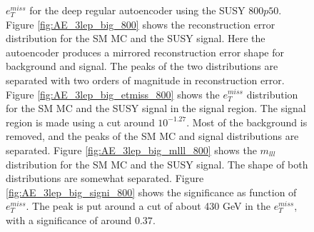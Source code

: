 \begin{figure}[H]
{    $e_T^{miss}$ for the deep regular autoencoder using the SUSY $800p50$. 
    Figure \ref{fig:AE_3lep_big_800} shows the reconstruction error 
    distribution for the SM MC and the SUSY signal. Here the autoencoder produces a mirrored reconstruction error shape for background and 
    signal. The peaks of the two distributions are separated with two orders of magnitude in reconstruction error. Figure \ref{fig:AE_3lep_big_etmiss_800} 
    shows the $e_T^{miss}$ distribution for the SM MC and the SUSY signal in the signal region. 
    The signal region is made using a cut around $10^{-1.27}$. Most of the background is removed, and the peaks of the SM MC and signal 
    distributions are separated. Figure \ref{fig:AE_3lep_big_mlll_800} shows the $m_{lll}$ distribution for the SM MC and the SUSY signal. 
    The shape of both distributions are somewhat separated. Figure \ref{fig:AE_3lep_big_signi_800} shows the significance as function of
    $e_T^{miss}$. The peak is put around a cut of about 430 GeV in the $e_T^{miss}$, with a significance of around $0.37$.}
    \label{fig:AE_3lep_big_rec_sig_signi_800}
\end{figure}


